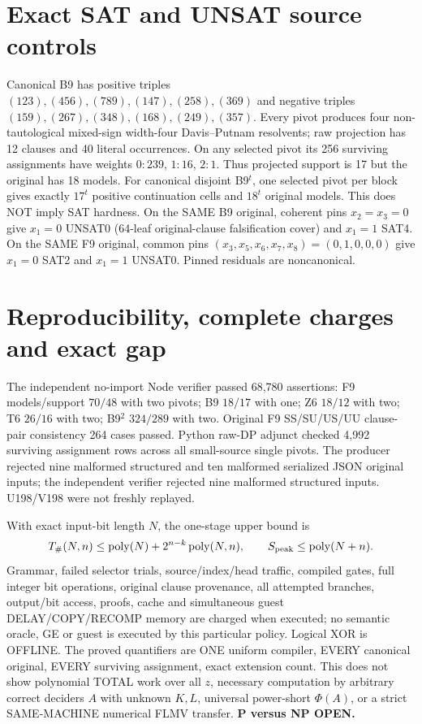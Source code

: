 \documentclass[11pt]{article}
\begin{document}
\section{Exact SAT and UNSAT source controls}
Canonical B9 has positive triples $(123),(456),(789),(147),(258),(369)$ and negative triples $(159),(267),(348),(168),(249),(357)$. Every pivot produces four non-tautological mixed-sign width-four Davis--Putnam resolvents; raw projection has 12 clauses and 40 literal occurrences. On any selected pivot its 256 surviving assignments have weights $0:239$, $1:16$, $2:1$. Thus projected support is 17 but the original has 18 models. For canonical disjoint B9$^t$, one selected pivot per block gives exactly $17^t$ positive continuation cells and $18^t$ original models. This does NOT imply SAT hardness. On the SAME B9 original, coherent pins $x_2=x_3=0$ give $x_1=0$ UNSAT0 (64-leaf original-clause falsification cover) and $x_1=1$ SAT4. On the SAME F9 original, common pins $(x_3,x_5,x_6,x_7,x_8)=(0,1,0,0,0)$ give $x_1=0$ SAT2 and $x_1=1$ UNSAT0. Pinned residuals are noncanonical.

\section{Reproducibility, complete charges and exact gap}
The independent no-import Node verifier passed 68,780 assertions: F9 models/support $70/48$ with two pivots; B9 $18/17$ with one; Z6 $18/12$ with two; T6 $26/16$ with two; B9$^2$ $324/289$ with two. Original F9 SS/SU/US/UU clause-pair consistency 264 cases passed. Python raw-DP adjunct checked 4,992 surviving assignment rows across all small-source single pivots. The producer rejected nine malformed structured and ten malformed serialized JSON original inputs; the independent verifier rejected nine malformed structured inputs. U198/V198 were not freshly replayed.

With exact input-bit length $N$, the one-stage upper bound is
\[
T_{\#}(N,n)\le \operatorname{poly}(N)+2^{n-k}\operatorname{poly}(N,n),\qquad
S_{\rm peak}\le\operatorname{poly}(N+n).
\]
Grammar, failed selector trials, source/index/head traffic, compiled gates, full integer bit operations, original clause provenance, all attempted branches, output/bit access, proofs, cache and simultaneous guest DELAY/COPY/RECOMP memory are charged when executed; no semantic oracle, GE or guest is executed by this particular policy. Logical XOR is OFFLINE. The proved quantifiers are ONE uniform compiler, EVERY canonical original, EVERY surviving assignment, exact extension count. This does not show polynomial TOTAL work over all $z$, necessary computation by arbitrary correct deciders $A$ with unknown $K,L$, universal power-short $\Phi(A)$, or a strict SAME-MACHINE numerical FLMV transfer. \textbf{P versus NP OPEN.}
\end{document}

